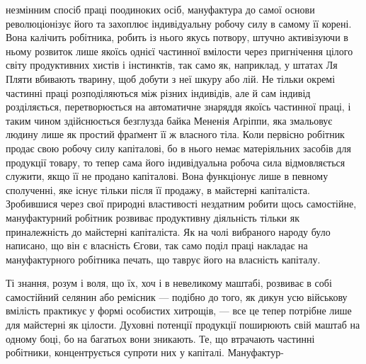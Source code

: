 незмінним спосіб праці поодиноких осіб, мануфактура до самої
основи революціонізує його та захоплює індивідуальну робочу
силу в самому її корені. Вона калічить робітника, робить із нього
якусь потвору, штучно активізуючи в ньому розвиток лише
якоїсь однієї частинної вмілости через пригнічення цілого світу
продуктивних хистів і інстинктів, так само як, наприклад, у
штатах Ля Пляти вбивають тварину, щоб добути з неї шкуру
або лій. Не тільки окремі частинні праці розподіляються між
різних індивідів, але й сам індивід розділяється, перетворюється
на автоматичне знаряддя якоїсь частинної праці, і таким чином
здійснюється безглузда байка Мененія Аґріппи, яка змальовує
людину лише як простий фраґмент її ж власного тіла. Коли
первісно робітник продає свою робочу силу капіталові, бо в нього
немає матеріяльних засобів для продукції товару, то тепер сама
його індивідуальна робоча сила відмовляється служити, якщо
її не продано капіталові. Вона функціонує лише в певному сполученні,
яке існує тільки після її продажу, в майстерні капіталіста.
Зробившися через свої природні властивості нездатним робити
щось самостійне, мануфактурний робітник розвиває продуктивну
діяльність тільки як приналежність до майстерні капіталіста.
Як на чолі вибраного народу було написано, що він є власність
Єгови, так само поділ праці накладає на мануфактурного робітника
печать, що таврує його на власність капіталу.

Ті знання, розум і воля, що їх, хоч і в невеликому маштабі,
розвиває в собі самостійний селянин або ремісник — подібно до
того, як дикун усю військову вмілість практикує у формі особистих
хитрощів, — все це тепер потрібне лише для майстерні як цілости.
Духовні потенції продукції поширюють свій маштаб на одному
боці, бо на багатьох вони зникають. Те, що втрачають частинні
робітники, концентрується супроти них у капіталі. Мануфактур-
